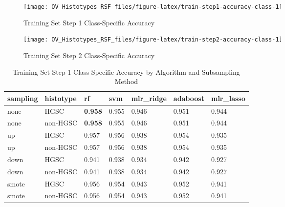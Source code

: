 \documentclass[
]{report}
\begin{document}
\begin{figure}[H]

{\centering \texttt{[image: OV\_Histotypes\_RSF\_files/figure-latex/train-step1-accuracy-class-1]} 

}

\caption{Training Set Step 1 Class-Specific Accuracy}\label{fig:train-step1-accuracy-class}
\end{figure}

\begin{figure}[H]

{\centering \texttt{[image: OV\_Histotypes\_RSF\_files/figure-latex/train-step2-accuracy-class-1]} 

}

\caption{Training Set Step 2 Class-Specific Accuracy}\label{fig:train-step2-accuracy-class}
\end{figure}

\begin{table}

\caption{\label{tab:train-step1-accuracy-class-table}Training Set Step 1 Class-Specific Accuracy by Algorithm and Subsampling Method}
\centering
\begin{tabular}[t]{l|l|l|l|l|l|l}
\hline
sampling & histotype & rf & svm & mlr\_ridge & adaboost & mlr\_lasso\\
\hline
none & HGSC & \textbf{0.958} & 0.955 & 0.946 & 0.951 & 0.944\\
\hline
none & non-HGSC & \textbf{0.958} & 0.955 & 0.946 & 0.951 & 0.944\\
\hline
up & HGSC & 0.957 & 0.956 & 0.938 & 0.954 & 0.935\\
\hline
up & non-HGSC & 0.957 & 0.956 & 0.938 & 0.954 & 0.935\\
\hline
down & HGSC & 0.941 & 0.938 & 0.934 & 0.942 & 0.927\\
\hline
down & non-HGSC & 0.941 & 0.938 & 0.934 & 0.942 & 0.927\\
\hline
smote & HGSC & 0.956 & 0.954 & 0.943 & 0.952 & 0.941\\
\hline
smote & non-HGSC & 0.956 & 0.954 & 0.943 & 0.952 & 0.941\\
\hline
\end{tabular}
\end{table}
\end{document}
